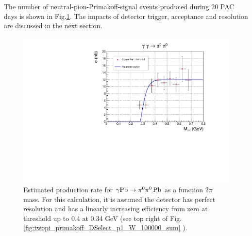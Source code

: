 The number of neutral-pion-Primakoff-signal events produced during 20
PAC days is shown in Fig.\ref{fig:sigma_2pi0_figs_3}. The impacts of
detector trigger, acceptance and resolution are discussed in the next
section.
\begin{figure}[tph]
\centering
\includegraphics[page=3,width=4.75in]{figures/sigma_2pi0_figs.pdf}
\caption{Estimated production rate  for $\gamma \rm{Pb}\rightarrow \pi^0\pi^0\,\rm{Pb}$ as a function 2$\pi$ mass. For this calculation, it is assumed the detector has perfect resolution and has a linearly increasing efficiency from zero at threshold up to 0.4 at 0.34 GeV (see top right of Fig.\,\ref{fig:twopi_primakoff_DSelect_p1_W_100000_sum} ).
\label{fig:sigma_2pi0_figs_3}}
\end{figure}

